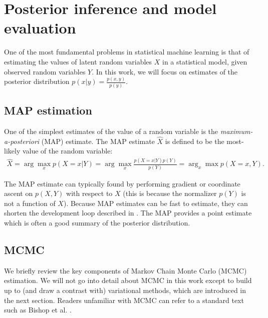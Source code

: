 
\section{Posterior inference and model evaluation}
One of the most fundamental problems in statistical machine learning
is that of estimating the values of latent random variables $X$ in a
statistical model, given observed random variables $Y$.  In this work, we will
focus on estimates of the posterior distribution $p(x | y) =
\frac{p(x, y)}{p(y)}$.

\subsection{MAP estimation}
One of the simplest estimates of the value of a random variable is the \emph{maximum-a-posteriori} (MAP) estimate.  The MAP estimate $\hat X$ is defined to be the most-likely value of the random variable:
\begin{align}
  \hat X = \arg \max_x p(X=x | Y) = \arg \max_x \frac{p(X=x | Y) p(Y)}{p(Y)} = \arg_x \max p(X=x, Y).
\end{align}

The MAP estimate can typically found by performing gradient or
coordinate ascent on $p(X, Y)$ with respect to $X$ (this is because
the normalizer $p(Y)$ is not a function of $X$).  Because MAP
estimates can be fast to estimate, they can shorten the development
loop described in . The MAP provides a point estimate
which is often a good summary of the posterior distribution.

\subsection{MCMC}


We briefly review the key components of Markov Chain Monte Carlo
(MCMC) estimation.  We will not go into detail about MCMC in this work
except to build up to (and draw a contrast with) variational methods,
which are introduced in the next section. Readers unfamiliar with MCMC
can refer to a standard text such as Bishop et al. \cite{bishop:2006}.


